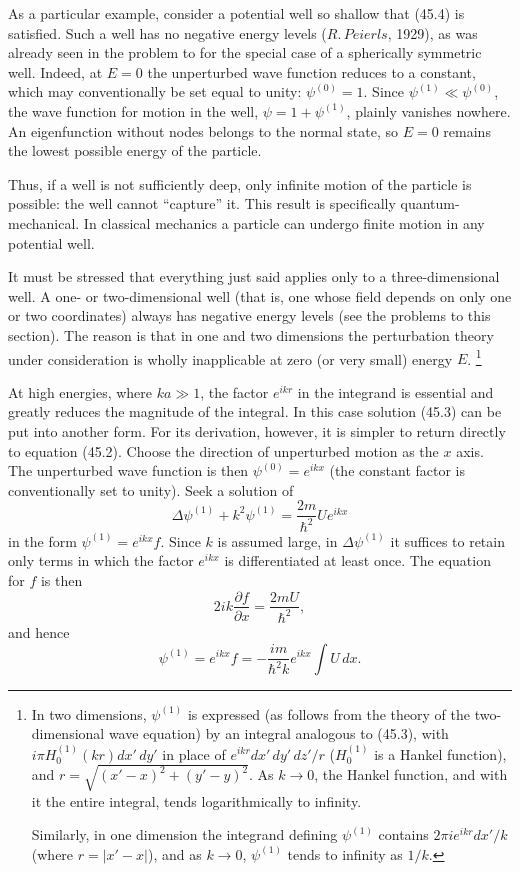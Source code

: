 As a particular example, consider a potential well so shallow that (45.4) is
satisfied. Such a well has no negative energy levels ($R.\,Peierls$, 1929),
as was already seen in the problem to  for the special case of a
spherically symmetric well. Indeed, at $E=0$ the unperturbed wave function
reduces to a constant, which may conventionally be set equal to unity:
$\psi^{(0)}=1$. Since $\psi^{(1)}\ll\psi^{(0)}$, the wave function for motion
in the well, $\psi=1+\psi^{(1)}$, plainly vanishes nowhere. An eigenfunction
without nodes belongs to the normal state, so $E=0$ remains the lowest
possible energy of the particle.

Thus, if a well is not sufficiently deep, only infinite motion of the
particle is possible: the well cannot ``capture'' it. This result is
specifically quantum-mechanical. In classical mechanics a particle can
undergo finite motion in any potential well.

It must be stressed that everything just said applies only to a
three-dimensional well. A one- or two-dimensional well (that is, one whose
field depends on only one or two coordinates) always has negative energy
levels (see the problems to this section). The reason is that in one and two
dimensions the perturbation theory under consideration is wholly inapplicable
at zero (or very small) energy $E$.
\footnote{In two dimensions, $\psi^{(1)}$ is expressed (as follows from the
theory of the two-dimensional wave equation) by an integral analogous to
(45.3), with $i\pi H_0^{(1)}(kr)dx'\,dy'$ in place of
$e^{ikr}dx'\,dy'\,dz'/r$ ($H_0^{(1)}$ is a Hankel function), and
$r=\sqrt{(x'-x)^2+(y'-y)^2}$. As $k\to0$, the Hankel function, and with it
the entire integral, tends logarithmically to infinity.

Similarly, in one dimension the integrand defining $\psi^{(1)}$ contains
$2\pi i e^{ikr}dx'/k$ (where $r=|x'-x|$), and as $k\to0$,
$\psi^{(1)}$ tends to infinity as $1/k$.}

At high energies, where $ka\gg1$, the factor $e^{ikr}$ in the integrand is
essential and greatly reduces the magnitude of the integral. In this case
solution (45.3) can be
put into another form. For its derivation, however, it is simpler to return
directly to equation (45.2). Choose the direction of unperturbed motion as the
$x$ axis. The unperturbed wave function is then $\psi^{(0)}=e^{ikx}$ (the
constant factor is conventionally set to unity). Seek a solution of
\[
  \Delta\psi^{(1)}+k^2\psi^{(1)}=\frac{2m}{\hbar^2}Ue^{ikx}
\]
in the form $\psi^{(1)}=e^{ikx}f$. Since $k$ is assumed large, in
$\Delta\psi^{(1)}$ it suffices to retain only terms in which the factor
$e^{ikx}$ is differentiated at least once. The equation for $f$ is then
\[
  2ik\frac{\partial f}{\partial x}=\frac{2mU}{\hbar^2},
\]
and hence
\begin{equation}
  \psi^{(1)}=e^{ikx}f=-\frac{im}{\hbar^2k}e^{ikx}\int U\,dx.
  \tag{45.5}
\end{equation}

